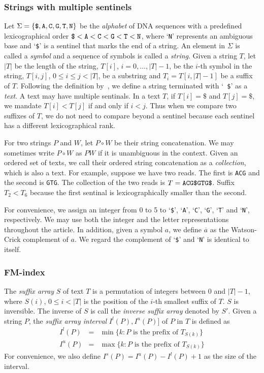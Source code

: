 \documentclass{bioinfo}
\begin{document}
\begin{methods}
\subsubsection{Strings with multiple sentinels}

Let $\Sigma=\{\mbox{\tt \$},\mbox{\tt A},\mbox{\tt C},\mbox{\tt G},\mbox{\tt
T},\mbox{\tt N}\}$ be the \emph{alphabet} of DNA sequences with a predefined
lexicographical order $\mbox{\tt \$}<\mbox{\tt A}<\mbox{\tt C}<\mbox{\tt
G}<\mbox{\tt T}<\mbox{\tt N}$, where `{\tt N}' represents an ambiguous base and
`{\tt \$}' is a sentinel that marks the end of a string. An element in $\Sigma$
is called a \emph{symbol} and a sequence of symbols is called a \emph{string}.
Given a string $T$, let $|T|$ be the length of the string, $T[i]$,
$i=0,\ldots,|T|-1$, be the $i$-th symbol in the string, $T[i,j]$, $0\le i\le
j<|T|$, be a substring and $T_i=T[i,|T|-1]$ be a suffix of $T$. Following
the definition by~\citet{en:2009fk}, we define a string terminated with `{\tt
\$}' as a \emph{text}. A text may have multiple sentinals. In a text $T$, if
$T[i]=\$$ and $T[j]=\$$, we mandate $T[i]<T[j]$ if and only if $i<j$. Thus when
we compare two suffixes of $T$, we do not need to compare beyond a sentinel
because each sentinel has a different lexicographical rank.

For two strings $P$ and $W$, let $P\circ W$ be their string concatenation.
We may sometimes write $P\circ W$ as $PW$ if it is unambiguous in the context.
Given an ordered set of texts, we call their ordered string concatenation
as a \emph{collection}, which is also a text. For example, suppose we have
two reads. The first is {\tt ACG} and the second is {\tt GTG}. The collection
of the two reads is $T=\mbox{\tt ACG\$GTG\$}$. Suffix $T_2<T_6$ because the first
sentinal is lexicographically smaller than the second.

For convenience, we assign an integer from 0 to 5 to `{\tt \$}', `{\tt A}',
`{\tt C}', `{\tt G}', `{\tt T}' and `{\tt N}', respectively. We may use both
the integer and the letter representations throughout the article. In addition,
given a symbol $a$, we define $\overline{a}$ as the Watson-Crick complement of $a$.
We regard the complement of `{\tt \$}' and `{\tt N}' is identical to itself.

\subsubsection{FM-index}

The \emph{suffix array} $S$ of text $T$ is a permutation of integers between 0 and
$|T|-1$, where $S(i)$, $0\le i<|T|$ is the position of the $i$-th smallest
suffix of $T$. $S$ is inversible. The inverse of $S$ is call the \emph{inverse
suffix array} denoted by $S'$. Given a string $P$, the \emph{suffix array interval}
$I^l(P),I^u(P)]$ of $P$ in $T$ is defined as
\begin{eqnarray*}
I^l(P)&=&\min\{k:\mbox{$P$ is the prefix of $T_{S(k)}$}\}\\
I^u(P) &=&\max\{k:\mbox{$P$ is the prefix of $T_{S(k)}$}\}
\end{eqnarray*}
For convenience, we also define $I^s(P)=I^u(P)-I^l(P)+1$ as the size of the interval.


\end{methods}
\end{document}
